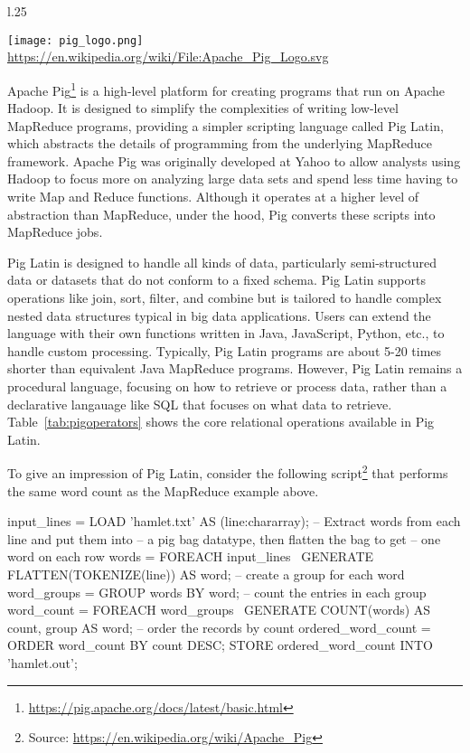 \begin{wrapfigure}{l}{.25\textwidth}
\begin{center}
\texttt{[image: pig\_logo.png]} \\
\tiny\url{https://en.wikipedia.org/wiki/File:Apache_Pig_Logo.svg}
\end{center}
\end{wrapfigure}
Apache Pig\footnote{\url{https://pig.apache.org/docs/latest/basic.html}} is a high-level platform for creating programs that run on Apache Hadoop. It is designed to simplify the complexities of writing low-level MapReduce programs, providing a simpler scripting language called Pig Latin, which abstracts the details of programming from the underlying MapReduce framework. Apache Pig was originally developed at Yahoo to allow analysts using Hadoop to focus more on analyzing large data sets and spend less time having to write Map and Reduce functions. Although it operates at a higher level of abstraction than MapReduce, under the hood, Pig converts these scripts into MapReduce jobs.

Pig Latin is designed to handle all kinds of data, particularly semi-structured data or datasets that do not conform to a fixed schema. Pig Latin supports operations like join, sort, filter, and combine but is tailored to handle complex nested data structures typical in big data applications. Users can extend the language with their own functions written in Java, JavaScript, Python, etc., to handle custom processing. Typically, Pig Latin programs are about 5-20 times shorter than equivalent Java MapReduce programs. However, Pig Latin remains a procedural language, focusing on how to retrieve or process data, rather than a declarative langauage like SQL that focuses on what data to retrieve. Table~\ref{tab:pigoperators} shows the core relational operations available in Pig Latin.

To give an impression of Pig Latin, consider the following script\footnote{\small Source: \url{https://en.wikipedia.org/wiki/Apache_Pig}} that performs the same word count as the MapReduce example above.

\begin{sqlcode}
input_lines = LOAD 'hamlet.txt' AS (line:chararray);
-- Extract words from each line and put them into 
-- a pig bag datatype, then flatten the bag to get
-- one word on each row
words = FOREACH input_lines \
   GENERATE FLATTEN(TOKENIZE(line)) AS word;
-- create a group for each word
word_groups = GROUP words BY word;
-- count the entries in each group
word_count = FOREACH word_groups  \
   GENERATE COUNT(words) AS count, group AS word;
-- order the records by count
ordered_word_count = ORDER word_count BY count DESC;
STORE ordered_word_count INTO 'hamlet.out';
\end{sqlcode}

